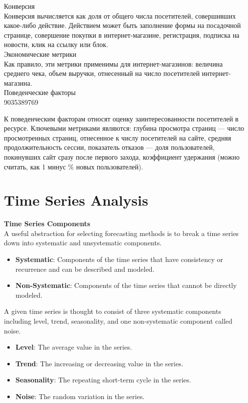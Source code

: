 \documentclass{book}
\begin{document}
Конверсия\\

Конверсия вычисляется как доля от общего числа посетителей, совершивших какое-либо действие. Действием может быть заполнение формы на посадочной странице, совершение покупки в интернет-магазине, регистрация, подписка на новости, клик на ссылку или блок.\\

Экономические метрики\\

Как правило, эти метрики применимы для интернет-магазинов: величина среднего чека, объем выручки, отнесенный на число посетителей интернет-магазина.\\

Поведенческие факторы\\9035389769

К поведенческим факторам относят оценку заинтересованности посетителей в ресурсе. Ключевыми метриками являются: глубина просмотра страниц — число просмотренных страниц, отнесенное к числу посетителей на сайте, средняя продолжительность сессии, показатель отказов — доля пользователей, покинувших сайт сразу после первого захода, коэффициент удержания (можно считать, как 1 минус \% новых пользователей).\\

\chapter{Time Series Analysis}

\textbf{Time Series Components}\\
A useful abstraction for selecting forecasting methods is to break a time series down into systematic and unsystematic components.\\

\begin{itemize}
\item \textbf{Systematic}: Components of the time series that have consistency or recurrence and can be described and modeled.
\item \textbf{Non-Systematic}: Components of the time series that cannot be directly modeled.
\end{itemize}

A given time series is thought to consist of three systematic components including level, trend, seasonality, and one non-systematic component called noise.

\begin{itemize}
\item \textbf{Level}: The average value in the series.
\item \textbf{Trend}: The increasing or decreasing value in the series.
\item \textbf{Seasonality}: The repeating short-term cycle in the series.
\item \textbf{Noise}: The random variation in the series.
\end{itemize}
\end{document}

